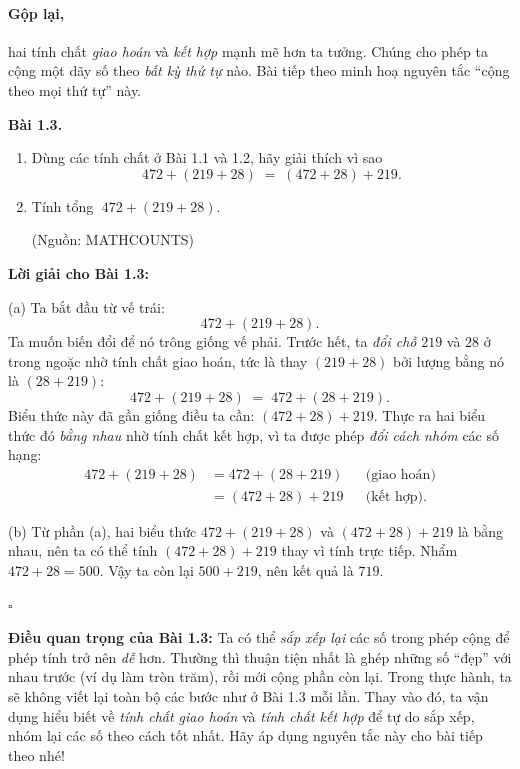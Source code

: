 \documentclass[14pt,a4paper]{extbook}
\newenvironment{problem}[1][]{
  \par\noindent\textbf{Bài #1.}\ \ignorespaces
}{\par}
\begin{document}

\paragraph{Gộp lại,} hai tính chất \emph{giao hoán} và \emph{kết hợp}
mạnh mẽ hơn ta tưởng. Chúng cho phép ta cộng một dãy số theo \emph{bất
kỳ thứ tự} nào. Bài tiếp theo minh hoạ nguyên tắc “cộng theo mọi thứ
tự” này.

\begin{problem}[1.3]
\begin{enumerate}[label=(\alph*)]
  \item Dùng các tính chất ở Bài 1.1 và 1.2, hãy giải thích vì sao
  \[
    472 + (219 + 28) \;=\; (472 + 28) + 219.
  \]
  \item Tính tổng \(\;472 + (219 + 28)\).
  \begin{flushright}\small(Nguồn: MATHCOUNTS)\end{flushright}
\end{enumerate}
\end{problem}

\noindent\textbf{Lời giải cho Bài 1.3:}

\smallskip
\noindent(a)\; Ta bắt đầu từ vế trái:
\[
  472 + (219 + 28).
\]
Ta muốn biến đổi để nó trông giống vế phải. Trước hết, ta \emph{đổi
chỗ} \(219\) và \(28\) ở trong ngoặc nhờ tính chất giao hoán, tức là
thay \((219+28)\) bởi lượng bằng nó là \((28+219)\):
\[
  472 + (219 + 28) \;=\; 472 + (28 + 219).
\]
Biểu thức này đã gần giống điều ta cần: \((472 + 28) + 219\).
Thực ra hai biểu thức đó \emph{bằng nhau} nhờ tính chất kết hợp, vì ta
được phép \emph{đổi cách nhóm} các số hạng:
\[
\begin{aligned}
  472 + (219 + 28) 
  &= 472 + (28 + 219) && \text{(giao hoán)}\\
  &= (472 + 28) + 219 && \text{(kết hợp).}
\end{aligned}
\]

\smallskip
\noindent(b)\; Từ phần (a), hai biểu thức
\(472 + (219 + 28)\) và \((472 + 28) + 219\) là bằng nhau, nên ta có
thể tính \((472 + 28) + 219\) thay vì tính trực tiếp.
Nhẩm \(472 + 28 = 500\). Vậy ta còn lại \(500 + 219\),
nên kết quả là \(719\).

\medskip
\noindent\(\square\)

\medskip
\noindent\textbf{Điều quan trọng của Bài 1.3:} Ta có thể \emph{sắp xếp
lại} các số trong phép cộng để phép tính trở nên \emph{dễ} hơn. Thường
thì thuận tiện nhất là ghép những số “đẹp” với nhau trước (ví dụ làm
tròn trăm), rồi mới cộng phần còn lại. Trong thực hành, ta sẽ không
viết lại toàn bộ các bước như ở Bài 1.3 mỗi lần. Thay vào đó, ta vận
dụng hiểu biết về \emph{tính chất giao hoán} và \emph{tính chất kết
hợp} để tự do sắp xếp, nhóm lại các số theo cách tốt nhất. Hãy áp dụng
nguyên tắc này cho bài tiếp theo nhé!
\end{document}
